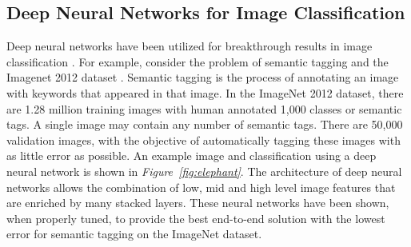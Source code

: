 \documentclass[conference,11pt]{IEEEtran}
\begin{document}
\subsection{Deep Neural Networks for Image Classification}

Deep neural networks have been utilized for breakthrough results in image classification \cite{he_deep_2015}. For example, consider the problem of semantic tagging and the Imagenet 2012 dataset \cite{russakovsky_imagenet_2015}. Semantic tagging is the process of annotating an image with keywords that appeared in that image. In the ImageNet 2012 dataset,  there are 1.28 million training images with human annotated 1,000 classes or semantic tags. A single image may contain any number of semantic tags. There are 50,000 validation images, with the objective of automatically tagging these images with as little error as possible. An example image and classification using a deep neural network is shown in \textit{Figure~\ref{fig:elephant}}.  The architecture of deep neural networks allows the combination of low, mid and high level image features that are enriched by many stacked layers. These neural networks have been shown, when properly tuned, to provide the best end-to-end solution with the lowest error for semantic tagging on the ImageNet dataset. 
\end{document}
